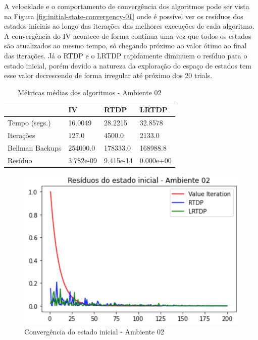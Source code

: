 \documentclass[letterpaper]{article}
\begin{document}
A velocidade e o comportamento de convergência dos algoritmos pode ser vista na Figura \ref{fig:initial-state-convergency-01} onde é possível ver os resíduos dos estados iniciais ao longo das iterações das melhores execuções de cada algoritmo. A convergência do IV acontece de forma contínua uma vez que todos os estados são atualizados ao mesmo tempo, só chegando próximo ao valor ótimo ao final das iterações. Já o RTDP e o LRTDP rapidamente diminuem o resíduo para o estado inicial, porém devido a natureza da exploração do espaço de estados tem esse valor decrescendo de forma irregular até próximo dos 20 trials.

\begin{table}[ht]
    \caption{Métricas médias dos algoritmos - Ambiente 02}
    \label{table:mean-performance-values-env02}
    \begin{tabular}{llll}
        \toprule
        {}              &        IV &      RTDP &      LRTDP \\
        \midrule
        Tempo (segs.)   &   16.0049 &   28.2215 &   32.8578 \\
        Iterações       &     127.0 &    4500.0 &    2133.0 \\
        Bellman Backups &  254000.0 &  178333.0 &  168988.8 \\
        Resíduo         & 3.782e-09 & 9.415e-14 & 0.000e+00 \\
        \bottomrule
    \end{tabular}
\end{table}

\begin{figure}[t]
    \centering
    \includegraphics[width=0.9\columnwidth]{initial-state-convergency-02}
    \caption{Convergência do estado inicial - Ambiente 02}
    \label{fig:initial-state-convergency-02}
\end{figure}
\end{document}
